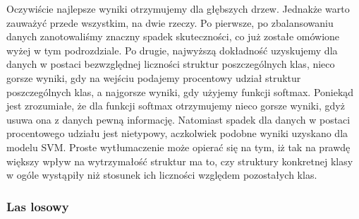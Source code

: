 Oczywiście najlepsze wyniki otrzymujemy dla głębszych drzew. Jednakże warto zauważyć przede wszystkim, na dwie rzeczy. Po pierwsze, po zbalansowaniu danych zanotowaliśmy znaczny spadek skuteczności, co już zostałe omówione wyżej w tym podrozdziale. Po drugie, najwyższą dokładność uzyskujemy dla danych w postaci bezwzględnej liczności struktur poszczególnych klas, nieco gorsze wyniki, gdy na wejściu podajemy procentowy udział struktur poszczególnych klas, a najgorsze wyniki, gdy użyjemy funkcji softmax. Poniekąd jest zrozumiałe, że dla funkcji softmax otrzymujemy nieco gorsze wyniki, gdyż usuwa ona z danych pewną informację. Natomiast spadek dla danych w postaci procentowego udziału jest nietypowy, aczkolwiek podobne wyniki uzyskano dla modelu SVM. Proste wytłumaczenie może opierać się na tym, iż tak na prawdę większy wpływ na wytrzymałość struktur ma to, czy struktury konkretnej klasy w ogóle wystąpiły niż stosunek ich liczności względem pozostałych klas.

\subsubsection{Las losowy}
\label{structures.with.rfc}

